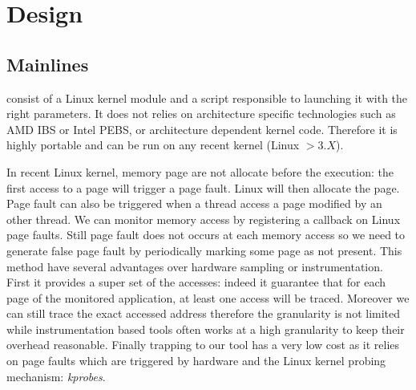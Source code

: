 \section{Design}
\label{sec:design}

\subsection{Mainlines}

\Moca consist of a Linux kernel module and a script responsible to launching it
with the right parameters. It does not relies on architecture specific
technologies such as AMD IBS or Intel PEBS, or architecture dependent kernel
code. Therefore it is highly portable and can be run on any recent kernel
(Linux $> 3.X$).

In recent Linux kernel, memory page are not allocate before the execution: the
first access to a page will trigger a page fault. Linux will then allocate the
page. Page fault can also be triggered when a thread access a page modified by
an other thread. We can monitor memory access by registering a callback on
Linux page faults. Still page fault does not occurs at each memory access so
we need to generate false page fault by periodically marking some page as not
present. This method have several advantages over hardware sampling or
instrumentation. First it provides a super set of the accesses: indeed it
guarantee that for each page of the monitored application, at least one access
will be traced. Moreover we can still trace the exact accessed address
therefore the granularity is not limited while instrumentation based tools
often works at a high granularity to keep their overhead reasonable.  Finally
trapping to our tool has a very low cost as it relies on page faults which
are triggered by hardware and the Linux kernel probing mechanism:
\emph{kprobes}.

